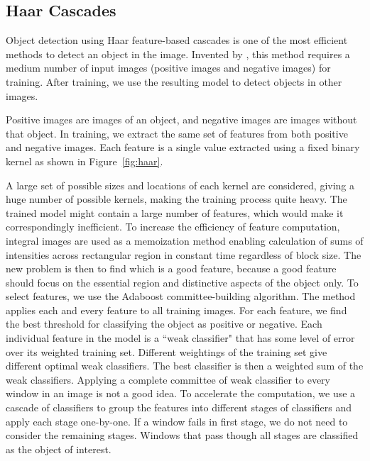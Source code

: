 \subsection{Haar Cascades}
Object detection using Haar feature-based cascades is one of the most efficient methods to detect an object in the image. Invented by , this method requires a medium number of input images (positive images and negative images) for training. After training, we use the resulting model to detect objects in other images.

Positive images are images of an object, and negative images are images without that object. In training, we extract the same set of features from both positive and negative images. Each feature is a single value extracted using a fixed binary kernel as shown in Figure~\ref{fig:haar}.

A large set of possible sizes and locations of each kernel are considered, giving a huge number of possible kernels, making the training process quite heavy. The trained model might contain a large number of features, which would make it correspondingly inefficient. To increase the efficiency of feature computation, integral images are used as a memoization method enabling calculation of sums of intensities across rectangular region in constant time regardless of block size. The new problem is then to find which is a good feature, because a good feature should focus on the essential region and distinctive aspects of the object only. To select features, we use the Adaboost committee-building algorithm. The method applies each and every feature to all training images. For each feature, we find the best threshold for classifying the object as positive or negative. Each individual feature in the model is a \textquotedblleft weak classifier" that has some level of error over its weighted training set. Different weightings of the training set give different optimal weak classifiers. The best classifier is then a weighted sum of the weak classifiers. Applying a complete committee of weak classifier to every window in an image is not a good idea. To accelerate the computation, we use a cascade of classifiers to group the features into different stages of classifiers and apply each stage one-by-one. If a window fails in first stage, we do not need to consider the remaining stages. Windows that pass though all stages are classified as the object of interest.

